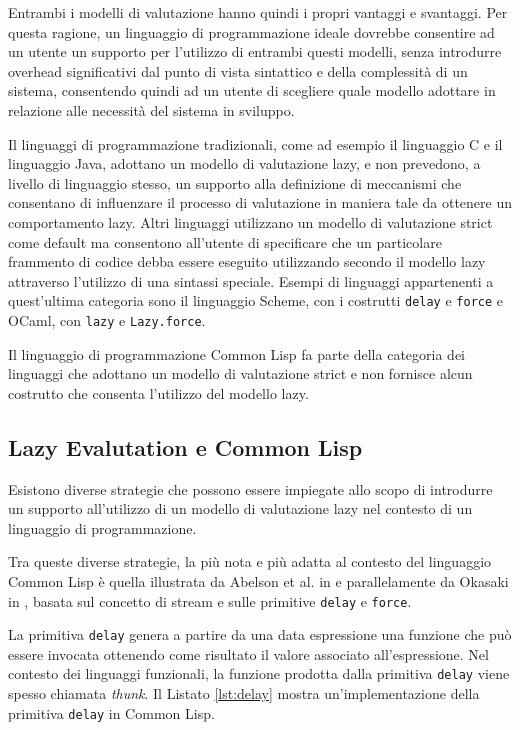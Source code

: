 Entrambi i modelli di valutazione hanno quindi i propri vantaggi e svantaggi. Per questa ragione, un linguaggio di programmazione ideale dovrebbe consentire ad un utente un supporto per l'utilizzo di entrambi questi modelli, senza introdurre overhead significativi dal punto di vista sintattico e della complessità di un sistema, consentendo quindi ad un utente di scegliere quale modello adottare in relazione alle necessità del sistema in sviluppo.

Il linguaggi di programmazione tradizionali, come ad esempio il linguaggio C e il linguaggio Java, adottano un modello di valutazione lazy, e non prevedono, a livello di linguaggio stesso, un supporto alla definizione di meccanismi che consentano di influenzare il processo di valutazione in maniera tale da ottenere un comportamento lazy. Altri linguaggi utilizzano un modello di valutazione strict come default ma consentono all'utente di specificare che un particolare frammento di codice debba essere eseguito utilizzando secondo il modello lazy attraverso l'utilizzo di una sintassi speciale. Esempi di linguaggi appartenenti a quest'ultima categoria sono il linguaggio Scheme, con i costrutti \texttt{delay} e \texttt{force} e OCaml, con \texttt{lazy} e \texttt{Lazy.force}.

Il linguaggio di programmazione Common Lisp fa parte della categoria dei linguaggi che adottano un modello di valutazione strict e non fornisce alcun costrutto che consenta l'utilizzo del modello lazy.

\subsection{Lazy Evalutation e Common Lisp}

Esistono diverse strategie che possono essere impiegate allo scopo di introdurre un supporto all'utilizzo di un modello di valutazione lazy nel contesto di un linguaggio di programmazione.

Tra queste diverse strategie, la più nota e più adatta al contesto del linguaggio Common Lisp è quella illustrata da Abelson et al. in \cite{Abelson1996} e parallelamente da Okasaki in \cite{Okasaki96}, basata sul concetto di stream e sulle primitive \texttt{delay} e \texttt{force}.

La primitiva \texttt{delay} genera a partire da una data espressione una funzione che può essere invocata ottenendo come risultato il valore associato all'espressione. Nel contesto dei linguaggi funzionali, la funzione prodotta dalla primitiva \texttt{delay} viene spesso chiamata \textit{thunk}. Il Listato \ref{lst:delay} mostra un'implementazione della primitiva \texttt{delay} in Common Lisp.

